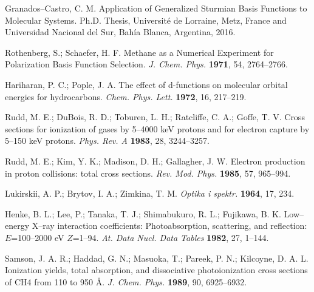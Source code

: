 \documentclass[10pt]{article}
\begin{document}
\begin{thebibliography}{10}
Granados--Castro, C. M.
Application of Generalized Sturmian Basis Functions to Molecular Systems.
Ph.D. Thesis, Universit\'e de Lorraine, Metz, France and 
Universidad Nacional del Sur, Bah\'ia Blanca, Argentina, 2016.

Rothenberg, S.; Schaefer, H. F.
Methane as a Numerical Experiment for Polarization Basis Function Selection.
{\it J. Chem. Phys.} {\bf 1971}, 54, 2764--2766.

Hariharan, P. C.; Pople, J. A.
The effect of d-functions on molecular orbital energies for hydrocarbons.
{\it Chem. Phys. Lett.} {\bf 1972}, 16, 217--219.

Rudd, M. E.; DuBois, R. D.; Toburen, L. H.; Ratcliffe, C. A.; Goffe, T. V.
Cross sections for ionization of gases by 5--4000 keV protons and for electron capture by 5--150 keV protons.
{\it Phys. Rev. A} {\bf 1983}, 28, 3244--3257.

Rudd, M. E.; Kim, Y. K.; Madison, D. H.; Gallagher, J. W.
Electron production in proton collisions: total cross sections.
{\it Rev. Mod. Phys.} {\bf 1985}, 57, 965--994.

Lukirskii, A. P.; Brytov, I. A.; Zimkina, T. M.
{\it Optika i spektr.} {\bf 1964}, 17, 234.

Henke, B. L.; Lee, P.; Tanaka, T. J.; Shimabukuro, R. L.; Fujikawa, B. K.
Low--energy X--ray interaction coefficients: Photoabsorption, scattering, and reflection: $E$=100--2000 eV $Z$=1--94.
{\it At. Data Nucl. Data Tables} {\bf 1982}, 27, 1--144.

Samson, J. A. R.; Haddad, G. N.; Masuoka, T.; Pareek, P. N.; Kilcoyne, D. A. L.
Ionization yields, total absorption, and dissociative photoionization cross sections of CH4 from 110 to 950 \AA.
{\it J. Chem. Phys.} {\bf 1989}, 90, 6925--6932.

\end{thebibliography}
\end{document}
